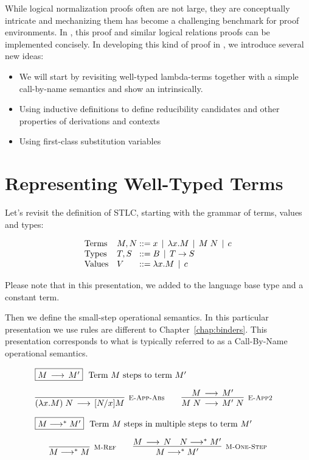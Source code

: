 While logical normalization proofs often are not large, they are
conceptually intricate and mechanizing them has become a challenging
benchmark for proof environments. In \beluga, this proof and similar
logical relations proofs can be implemented concisely. In developing
this kind of proof in \beluga, we introduce several new ideas:

\begin{itemize}
\item We will start by revisiting well-typed lambda-terms together with a
simple call-by-name semantics and show an intrinsically.

\item Using inductive definitions to define reducibility candidates
  and other properties of derivations and contexts

\item Using first-class substitution variables

\end{itemize}


\section{Representing Well-Typed Terms}

Let's revisit the definition of STLC, starting with the grammar of terms, values and types:

\[
\begin{array}{ll@{\bnfas}l}
\mbox{Terms} & M, N & x \bnfalt \lam x.M \bnfalt M \app N \bnfalt c\\
\mbox{Types} & T, S & B \bnfalt T \arrow S\\
\mbox{Values} & V & \lam x.M \bnfalt c
\end{array}
\]

Please note that in this presentation, we added to the language base
type and a constant term.

Then we define the small-step operational semantics. In this
particular presentation we use rules are different to
Chapter~\ref{chap:binders}. This presentation corresponds to what is
typically referred to as a Call-By-Name operational semantics.

\[
\begin{array}{c}
\multicolumn{1}{l}{\fbox{$M \Steps M'$}~~ \mbox{Term $M$ steps to term $M'$}}
\\[1em]
\infer[\EAppBeta]{(\lam x.M) \app N \Steps [N/x]M}{} \qquad
\infer[\EAppArgStep]{M \app N \Steps M'\;N}{M \Steps M'} \quad
\\[1em]
\multicolumn{1}{l}{\fbox{$M \MSteps M'$}~~ \mbox{Term $M$ steps in
    multiple steps to term $M'$}}\\[1em]
\infer[\MRef]{M \MSteps M}{} \qquad
\infer[\MOne]{M \MSteps M'}{M \Steps N & N \MSteps M'} 
\end{array}
\]


